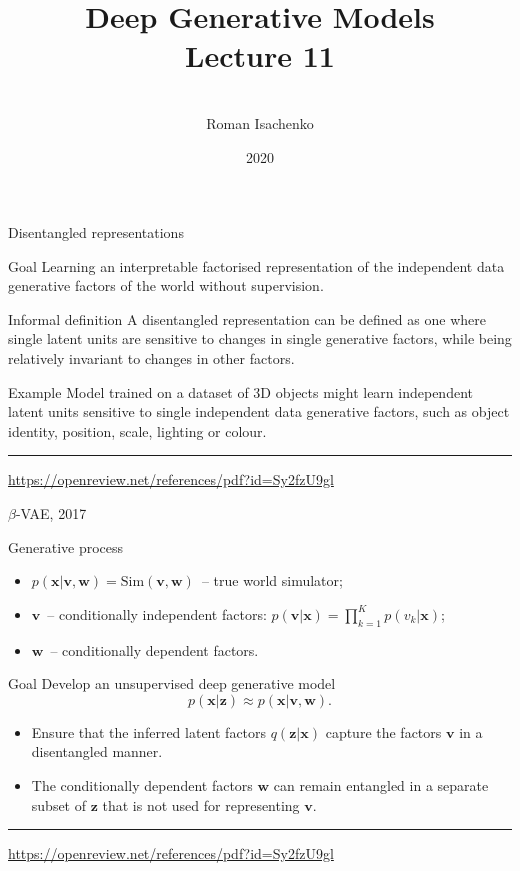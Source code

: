 \documentclass{beamer}
\title[\hbox to 56mm{Deep Generative Models  \hfill\insertframenumber\,/\,\inserttotalframenumber}]
{Deep Generative Models \\ Lecture 11}
\author[Roman Isachenko]{\\Roman Isachenko}
\institute[MIPT]{Moscow Institute of Physics and Technology \\
}
\date{2020}
\newcommand{\bv}{\mathbf{v}}
\newcommand{\bw}{\mathbf{w}}
\newcommand{\bx}{\mathbf{x}}
\newcommand{\bz}{\mathbf{z}}
\begin{document}
\begin{frame}
\titlepage
\end{frame}
\begin{frame}{Disentangled representations}
\begin{block}{Goal}
    Learning an interpretable factorised representation of the independent data generative factors of the world without supervision. 
\end{block}
\begin{block}{Informal definition}
A disentangled representation can be defined as one where single latent units are sensitive to changes in single generative factors, while being relatively invariant to changes in other factors. 
\end{block}
\begin{block}{Example}
Model trained on a dataset of 3D objects might learn independent latent units sensitive to single independent data generative factors, such as object identity, position, scale, lighting or colour. 
\end{block}
\vfill
\hrule\medskip
{\scriptsize \href{https://openreview.net/references/pdf?id=Sy2fzU9gl}{https://openreview.net/references/pdf?id=Sy2fzU9gl}}
\end{frame}
\begin{frame}{$\beta$-VAE, 2017}
\begin{block}{Generative process}
\begin{itemize}
    \item $p(\bx | \bv, \bw) = \text{Sim}(\bv, \bw)$~-- true world simulator;
    \item $\bv$~-- conditionally independent factors: $p(\bv | \bx) = \prod_{k=1}^K p(v_k | \bx)$;
    \item $\bw$~-- conditionally dependent factors. 
\end{itemize}
\end{block}
\begin{block}{Goal}
Develop an unsupervised deep generative model
\[
    p(\bx | \bz) \approx p(\bx | \bv, \bw).
\]
\vspace{-0.5cm}
\begin{itemize}
    \item Ensure that the inferred latent factors $q(\bz|\bx)$ capture the factors $\bv$ in a disentangled manner. 
    \item The conditionally dependent factors $\bw$ can remain entangled in a separate subset of $\bz$ that is not used for representing $\bv$. 
\end{itemize}
\end{block}
\vfill
\hrule\medskip
{\scriptsize \href{https://openreview.net/references/pdf?id=Sy2fzU9gl}{https://openreview.net/references/pdf?id=Sy2fzU9gl}}
\end{frame}
\end{document}

